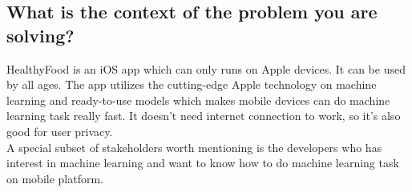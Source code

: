 \documentclass{article}
\begin{document}
\subsection{What is the context of the problem you are solving?}
HealthyFood is an iOS app which can only runs on Apple devices. It can be used 
by all ages. The app utilizes the cutting-edge Apple technology on machine 
learning and ready-to-use models which makes mobile devices can do machine 
learning task really fast. It doesn't need internet connection to work, so it's 
also good for user privacy.\\A special subset of stakeholders worth mentioning 
is the developers who has interest in machine learning and want to know how to 
do machine learning task on mobile platform. 

\end{document}
